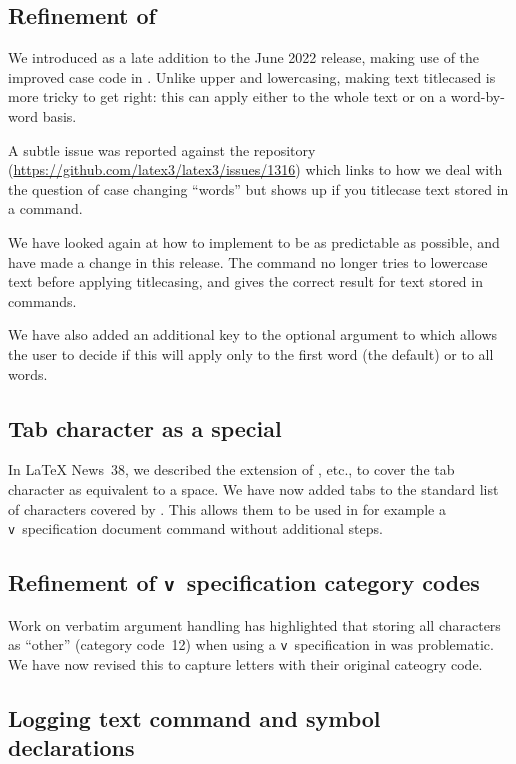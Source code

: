 \documentclass{ltnews}
\begin{document}
\subsection{Refinement of }

We introduced  as a late addition to the June
2022 release, making use of the improved case code in
. Unlike upper and lowercasing, making text
titlecased is more tricky to get right: this can apply either to
the whole text or on a word-by-word basis.

A subtle issue was reported against the  repository
(\url{https://github.com/latex3/latex3/issues/1316}) which links
to how we deal with the question of case changing
\enquote{words} but shows up if you titlecase text stored in a
command.

We have looked again at how to implement  to
be as predictable as possible, and have made a change in this
release. The command no longer tries to lowercase text before
applying titlecasing, and gives the correct result for text
stored in commands.

We have also added an additional key to the optional argument to
 which allows the user to decide if this will
apply only to the first word (the default) or to all words.

\subsection{Tab character as a special}

In \LaTeX{} News~38, we described the extension of , etc., to cover
the tab character as equivalent to a space. We have now added tabs to the
standard list of characters covered by . This allows them to
be used in for example a \texttt{v}~specification document command without
additional steps.

\subsection{Refinement of \texttt{v}~specification category codes}

Work on verbatim argument handling has highlighted that storing
all characters as \enquote{other} (category code~12) when using a
\texttt{v}~specification in  was problematic. We have now
revised this to capture letters with their original cateogry code.

\subsection{Logging text command and symbol declarations}
\end{document}
